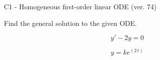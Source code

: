 \begin{exercise}
  \begin{exerciseTitle}C1 - Homogeneous first-order linear ODE (ver. 74)\end{exerciseTitle}
  \begin{exerciseStatement}
    
Find the general solution to the given ODE.

    
\[y'-2y=0\]

  \end{exerciseStatement}
  \begin{exerciseAnswer}
    
\[y= k e^{\left(2 \, t\right)}\]

  \end{exerciseAnswer}
\end{exercise}